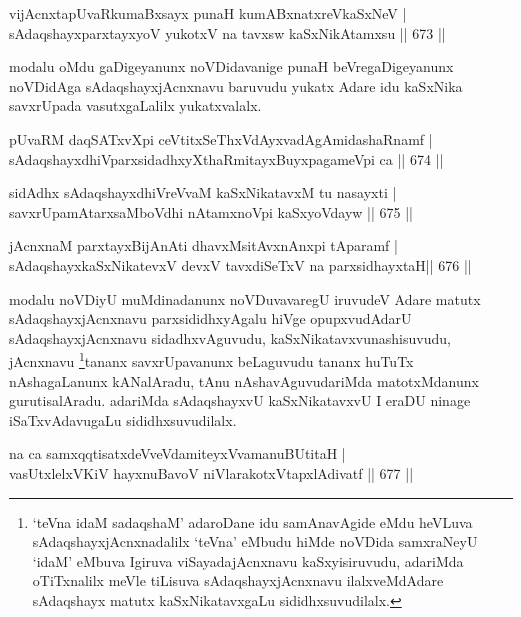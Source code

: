 
\begin{shl}
vijAcnxtapUvaRkumaBxsayx punaH kumABxnatxreVkaSxNeV | \\
sAdaqshayxparxtayxyoV yukotxV na tavxsw kaSxNikAtamxsu \hfill||  673 ||  
\end{shl}

\begin{artha}
modalu oMdu gaDigeyanunx noVDidavanige punaH beVregaDigeyanunx noVDidAga sAdaqshayxjAcnxnavu baruvudu yukatx Adare idu kaSxNika savxrUpada vasutxgaLalilx yukatxvalalx.
\end{artha}

\begin{shl}
pUvaRM daqSATxvX\s pi ceVtitxSeThxVdAyxvadAgAmidashaRnamf | \\
sAdaqshayxdhiVparxsidadhxyXthaRmitayxBuyxpagameV\s pi ca \hfill||  674 ||  
\end{shl}
				
\begin{shl}
sidAdhx sAdaqshayxdhiVreVvaM kaSxNikatavxM tu nasayxti | \\
savxrUpamAtarxsaMboVdhi nA\s \s tamxnoV\s pi kaSxyoVdayw \hfill||  675 ||  
\end{shl}

\begin{shl}
jAcnxnaM parxtayxBijAnAti dhavxMsitAvxnAnxpi tAparamf | \\
sAdaqshayxkaSxNikatevxV devxV tavxdiSeTxV na parxsidhayxtaH\hfill ||  676 ||  
\end{shl}

\begin{artha}
modalu noVDiyU muMdinadanunx noVDuvavaregU iruvudeV Adare matutx sAdaqshayxjAcnxnavu parxsididhxyAgalu hiVge opupxvudAdarU sAdaqshayxjAcnxnavu sidadhxvAguvudu, kaSxNikatavxvunashisuvudu, jAcnxnavu \footnote{`teVna idaM sadaqshaM' adaroDane idu samAnavAgide eMdu heVLuva sAdaqshayxjAcnxnadalilx  `teVna' eMbudu hiMde noVDida samxraNeyU `idaM' eMbuva Igiruva viSayadajAcnxnavu kaSxyisiruvudu, adariMda oTiTxnalilx meVle tiLisuva sAdaqshayxjAcnxnavu ilalxveMdAdare sAdaqshayx matutx kaSxNikatavxgaLu sididhxsuvudilalx.}tananx savxrUpavanunx beLaguvudu tananx huTuTx nAshagaLanunx kANalAradu, tAnu nAshavAguvudariMda matotxMdanunx gurutisalAradu. adariMda sAdaqshayxvU kaSxNikatavxvU I eraDU ninage iSaTxvAdavugaLu sididhxsuvudilalx.
\end{artha}

\begin{shl}
na ca samxqqtisatxdeVveVdamiteyxVvamanuBUtitaH | \\
vasUtxlelxVKiV hayxnuBavoV niVlarakotxVtapxlAdivatf \hfill||  677 ||  
\end{shl}

